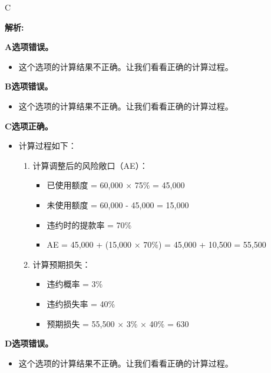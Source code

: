 \documentclass{article}
\newenvironment{explanation}
{\textbf{解析:}\par}
{\par}
\begin{document}
\begin{correctanswer}
    C
\end{correctanswer}

\begin{explanation}
    \textbf{A选项错误。}
    \begin{itemize}
        \item 这个选项的计算结果不正确。让我们看看正确的计算过程。
    \end{itemize}
    
    \textbf{B选项错误。}
    \begin{itemize}
        \item 这个选项的计算结果不正确。让我们看看正确的计算过程。
    \end{itemize}
    
    \textbf{C选项正确。}
    \begin{itemize}
        \item 计算过程如下：
        \begin{enumerate}
            \item 计算调整后的风险敞口（AE）：
            \begin{itemize}
                \item 已使用额度 = 60,000 × 75\% = 45,000
                \item 未使用额度 = 60,000 - 45,000 = 15,000
                \item 违约时的提款率 = 70\%
                \item AE = 45,000 + (15,000 × 70\%) = 45,000 + 10,500 = 55,500
            \end{itemize}
            \item 计算预期损失：
            \begin{itemize}
                \item 违约概率 = 3\%
                \item 违约损失率 = 40\%
                \item 预期损失 = 55,500 × 3\% × 40\% = 630
            \end{itemize}
        \end{enumerate}
    \end{itemize}
    
    \textbf{D选项错误。}
    \begin{itemize}
        \item 这个选项的计算结果不正确。让我们看看正确的计算过程。
    \end{itemize}
\end{explanation}
\end{document}

